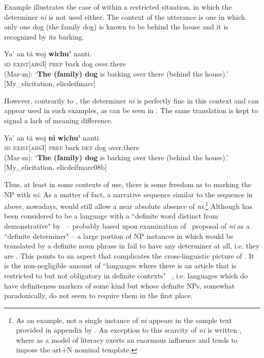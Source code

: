 \documentclass[output=paper
,modfonts
,nonflat]{langsci/langscibook}
\begin{document}
Example  illustrates the case of  within a restricted situation, in which the determiner \textit{ni} is not used either. The context of the utterance is one in which only one dog (the family dog) is known to be behind the house and it is recognized by its barking. 


\ea \label{ex:pico:8}
\gll Ya' an t\"a woj \textbf{wichu'} nanti. \\
\textsc{sd} \textsc{exist[abs3]} \textsc{prep} {bark} {dog} {over.there} \\
\glt (Mar-m): `\textbf{The (family) dog} is barking over there (behind the house).' [My\_elicitation, elic\textunderscore deif\textunderscore marc]
\z


However, contrarily to , the determiner \textit{ni} is perfectly fine in this context and can appear used in such examples, as can be seen in . The same translation is kept to signal a lack of meaning difference.


\ea \label{ex:pico:9}
\gll Ya' an t\"a woj \textbf{ni} \textbf{wichu'} nanti. \\
\textsc{sd} \textsc{exist[abs3]} \textsc{prep} {bark} \textsc{det} {dog} {over.there} \\
\glt (Mar-m): `\textbf{The (family) dog} is barking over there (behind the house).' [My\_elicitation, elic\textunderscore deif\textunderscore marc\textunderscore08b]
\z


Thus, at least in some contexts of use, there is some freedom as to marking the NP with \textit{ni}. As a matter of fact, a narrative sequence similar to the sequence in  above, nowadays, would still allow a near absolute absence of \textit{ni}.\footnote{As an example, not a single instance of \textit{ni} appears in the sample text provided in appendix by \citet[][371--382]{Knowles1984}. An exception to this scarcity of \textit{ni} is written , where  as a model of literacy exerts an enormous influence and tends to impose the art+N nominal template.} Although  has been considered to be a language with a ``definite word distinct from demonstrative" by~\citet{Dryer2005definiteart} -- probably based upon examination of~ proposal of \textit{ni} as a ``definite determiner" -- a large portion of NP instances in  which would be translated by a definite noun phrase in  fail to have any determiner at all, i.e. they are . This points to an aspect that complicates the cross-linguistic picture of . It is the non-negligible amount of ``languages where there is an article that is restricted to but not obligatory in definite contexts" ~\citep[e234]{Dryer2014}, i.e. languages which do have definiteness markers of some kind but whose definite NPs, somewhat paradoxically, do not seem to require them in the first place.
\end{document}

